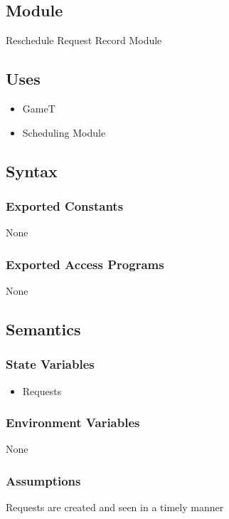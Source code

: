\documentclass[12pt, titlepage]{article}
\begin{document}
\subsection{Module}

Reschedule Request Record Module

\subsection{Uses}
\begin{itemize}
  \item GameT
  \item Scheduling Module
\end{itemize}

\subsection{Syntax}

\subsubsection{Exported Constants}
None

\subsubsection{Exported Access Programs}
None

\subsection{Semantics}

\subsubsection{State Variables}
\begin{itemize}
  \item Requests
\end{itemize}

\subsubsection{Environment Variables}

None

\subsubsection{Assumptions}

Requests are created and seen in a timely manner
\end{document}
